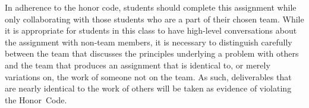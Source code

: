In adherence to the honor code, students should complete this assignment while only collaborating with those students
who are a part of their chosen team. While it is appropriate for students in this class to have high-level
conversations about the assignment with non-team members, it is necessary to distinguish carefully between the team that
discusses the principles underlying a problem with others and the team that produces an assignment that is identical to,
or merely variations on, the work of someone not on the team.  As such, deliverables that are nearly identical to the
work of others will be taken as evidence of violating the \mbox{Honor Code}.

  
